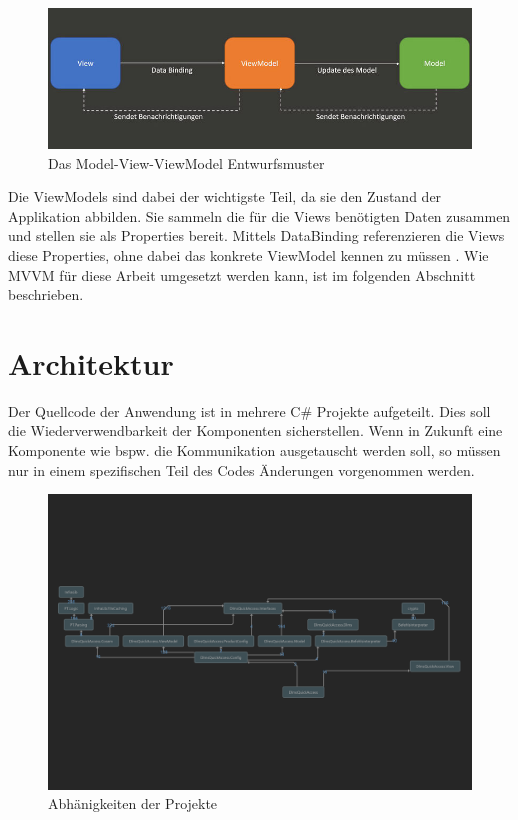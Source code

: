 \begin{figure}[H]
   \centering
   \includegraphics[width=1.0\textwidth]{gfx/mvvm.jpg}
   \caption{
      Das Model-View-ViewModel Entwurfsmuster
   }
   \label{fig:mvvm}
\end{figure}
Die ViewModels sind dabei der wichtigste Teil, da sie den Zustand der Applikation abbilden.
Sie sammeln die für die Views benötigten Daten zusammen und stellen sie als Properties bereit.
Mittels DataBinding referenzieren die Views diese Properties, ohne dabei das konkrete ViewModel kennen zu müssen \parencite{vermeir2022desktop}.
Wie \ac{MVVM} für diese Arbeit umgesetzt werden kann, ist im folgenden Abschnitt beschrieben.




\section{Architektur}
Der Quellcode der Anwendung ist in mehrere C\# Projekte aufgeteilt.
Dies soll die Wiederverwendbarkeit der Komponenten sicherstellen.
Wenn in Zukunft eine Komponente wie bspw. die Kommunikation ausgetauscht werden soll, so müssen nur in einem spezifischen Teil des Codes Änderungen vorgenommen werden.

\begin{figure}[H]
   \centering
   \includegraphics[width=1.0\textwidth]{gfx/Architecture view for DlmsQuickAccess.png}
   \caption{
      Abhänigkeiten der Projekte
   }
   \label{fig:projectDependencies}
\end{figure}

